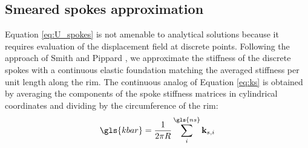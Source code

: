 \documentclass[\rootdir/thesis.tex]{subfiles}
\begin{document}






\subsection{Smeared spokes approximation}
\label{sec:smeared_spokes}
Equation \ref{eq:U_spokes} is not amenable to analytical solutions because it requires evaluation of the displacement field at discrete points. Following the approach of Smith \cite{Smith1901} and Pippard \cite{Pippard1931}, we approximate the stiffness of the discrete spokes with a continuous elastic foundation matching the averaged stiffness per unit length along the rim. The continuous analog of Equation \eqref{eq:ks} is obtained by averaging the components of the spoke stiffness matrices in cylindrical coordinates and dividing by the circumference of the rim:
\begin{equation}
\label{eq:k_bar}
\gls{kbar} = \frac{1}{2\pi R} \sum_i^{\gls{ns}} \mathbf{k}_{s,i}
\end{equation}
\end{document}
